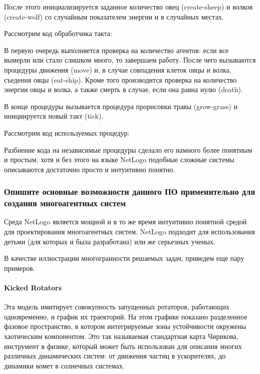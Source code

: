 \documentclass[14pt,a4paper,report]{report}
\begin{document}
После этого инициализируется заданное количество овец (create-sheep) и волков (create-wolf) со случайным показателем энергии и в случайных местах.

Рассмотрим код обработчика такта:



В первую очередь выполняется проверка на количество агентов: если все вымерли или стало слишком много, то завершаем работу. После чего вызываются процедуры движения (move) и, в случае совпадения клеток овцы и волка, съедения овцы (eat-ship). Кроме того производится проверка на количество энергии овцы и волка, а также смерть в случае, если она равна нулю (death).

В конце процедуры вызывается процедура прорисовки травы (grow-grass) и инициируется новый такт (tick).

Рассмотрим код используемых процедур:



Разбиение кода на независимые процедуры сделало его намного более понятным и простым, хотя и без этого на языке NetLogo подобные сложные системы описываются достаточно просто и интуитивно понятно.

\subsubsection{Опишите основные возможности данного ПО применительно для создания многоагентных систем}

Среда NetLogo является мощной и в то же время интуитивно понятной средой для проектирования многоагентных систем. NetLogo подходит для использования детьми (для которых и была разработана) или же серьезных ученых.

В качестве иллюстрации многогранности решаемых задач, приведем еще пару примеров.



\paragraph{Kicked Rotators}


Эта модель имитирует совокупность запущенных ротаторов, работающих одновременно, и график их траекторий. На этом графике показано разделенное фазовое пространство, в котором интегрируемые зоны устойчивости окружены хаотическим компонентом. Это так называемая стандартная карта Чирикова, инструмент в физике, который может быть использован для описания многих различных динамических систем: от движения частиц в ускорителях, до динамики комет в солнечных системах.
\end{document}
